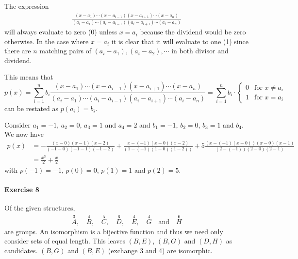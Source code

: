 \documentclass{article}
\begin{document}
The expression
\begin{align*}
    \frac{(x - a_1) \cdots (x - a_{i - 1})(x - a_{i + 1}) \cdots (x - a_n)}{(a_i - a_1) \cdots (a_i - a_{i - 1})(a_i - a_{i + 1}) \cdots (a_i - a_n)}
\end{align*}
will always evaluate to zero (0) unless $x = a_i$ because the dividend would be zero otherwise. In the case where $x = a_i$ it is clear that it will evaluate to one (1) since there are $n$ matching pairs of $(a_i  - a_1), (a_i - a_2), \cdots$ in both divisor and dividend.

This means that
\begin{equation*}
    p(x) = \sum^{n}_{i = 1} b_i \frac{(x - a_1) \cdots (x - a_{i - 1})(x - a_{i + 1}) \cdots (x - a_n)}{(a_i - a_1) \cdots (a_i - a_{i - 1})(a_i - a_{i + 1}) \cdots (a_i - a_n)} = \sum^{n}_{i = 1} b_i \cdot \begin{cases}
        0 & \text{for } x \neq a_i \\
        1 & \text{for } x = a_i
    \end{cases}
\end{equation*}
can be restated as $p(a_i) = b_i$.

Consider $a_1 = -1$, $a_2 = 0$, $a_3 = 1$ and $a_4 = 2$ and $b_1 = -1$, $b_2 = 0$, $b_3 = 1$ and $b_4$. We now have
\begin{align*}
    p(x) &= -\frac{(x - 0)(x - 1)(x - 2)}{(-1 - 0)(-1-1)(-1-2)} + \frac{x-(-1)(x-0)(x-2)}{(1-(-1)(1-0)(1-2))}+5\frac{(x-(-1)(x-0))(x-0)(x-1)}{(2-(-1))(2-0)(2-1)} \\
    &= \frac{x^3}{2}+\frac{x}{2}
\end{align*}
with $p(-1) = -1$, $p(0) = 0$, $p(1) = 1$ and $p(2) = 5$.

\paragraph{Exercise 8}

Of the given structures,
\begin{align*}
    \overset{3}{A},\quad \overset{4}{B},\quad \overset{5}{C},\quad \overset{6}{D},\quad \overset{4}{E},\quad \overset{4}{G} \quad\text{and}\quad \overset{6}{H}
\end{align*}
are groups. An isomorphism is a bijective function and thus we need only consider sets of equal length. This leaves $(B, E)$, $(B, G)$ and $(D, H)$ as candidates. $(B, G)$ and $(B, E)$ (exchange 3 and 4) are isomorphic.
\end{document}
